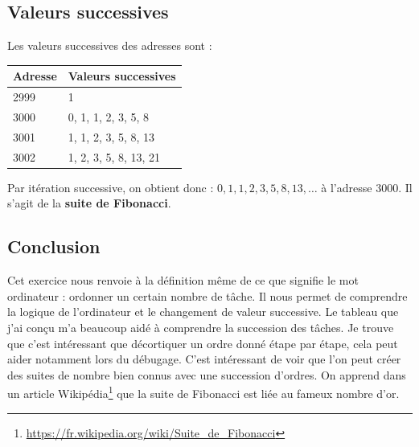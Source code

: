 \begin{graybox}
    \subsection{Valeurs successives}

    Les valeurs successives des adresses sont :

    \begin{center}
        \begin{tabular}{ll}
            \hline
            \textbf{Adresse} & \textbf{Valeurs successives} \\
            \hline
            2999 & 1 \\
            3000 & 0, 1, 1, 2, 3, 5, 8 \\
            3001 & 1, 1, 2, 3, 5, 8, 13 \\
            3002 & 1, 2, 3, 5, 8, 13, 21 \\
            \hline
        \end{tabular}
    \end{center}

    Par itération successive, on obtient donc :
    $0, 1, 1, 2, 3, 5, 8, 13, \ldots$ à l’adresse 3000.
    Il s’agit de la \textbf{suite de Fibonacci}.



    \subsection{Conclusion}
    Cet exercice nous renvoie à la définition même de ce que signifie le mot
    ordinateur : ordonner un certain nombre de tâche. Il nous permet de comprendre
    la logique de l'ordinateur et le changement de valeur successive. Le tableau
    que j'ai conçu m'a beaucoup aidé à comprendre la succession des tâches. Je 
    trouve que c'est intéressant que décortiquer un ordre donné étape par étape, cela 
    peut aider notamment lors du débugage. C'est intéressant de voir que l'on peut
    créer des suites de nombre bien connus avec une succession d'ordres. 
    On apprend dans un article Wikipédia\footnote{\url{https://fr.wikipedia.org/wiki/Suite_de_Fibonacci}} que la suite de Fibonacci est liée au fameux nombre d'or.

    

\end{graybox}

